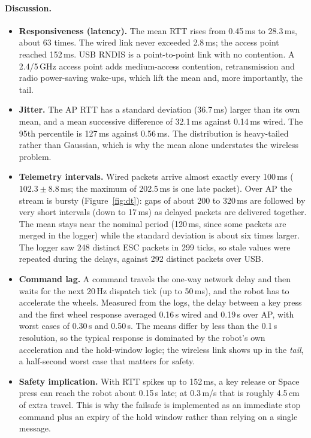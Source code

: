 \documentclass[11pt,a4paper]{article}
\begin{document}
\paragraph{Discussion.}
\begin{itemize}
  \item \textbf{Responsiveness (latency).} The mean RTT rises from 0.45\,ms to 28.3\,ms, about 63 times. The wired link never exceeded 2.8\,ms; the access point reached 152\,ms. USB RNDIS is a point-to-point link with no contention. A 2.4/5\,GHz access point adds medium-access contention, retransmission and radio power-saving wake-ups, which lift the mean and, more importantly, the tail.
  \item \textbf{Jitter.} The AP RTT has a standard deviation (36.7\,ms) larger than its own mean, and a mean successive difference of 32.1\,ms against 0.14\,ms wired. The 95th percentile is 127\,ms against 0.56\,ms. The distribution is heavy-tailed rather than Gaussian, which is why the mean alone understates the wireless problem.
  \item \textbf{Telemetry intervals.} Wired packets arrive almost exactly every 100\,ms ($102.3\pm8.8$\,ms; the maximum of 202.5\,ms is one late packet). Over AP the stream is bursty (Figure~\ref{fig:dt}): gaps of about 200 to 320\,ms are followed by very short intervals (down to 17\,ms) as delayed packets are delivered together. The mean stays near the nominal period (120\,ms, since some packets are merged in the logger) while the standard deviation is about six times larger. The logger saw 248 distinct ESC packets in 299 ticks, so stale values were repeated during the delays, against 292 distinct packets over USB.
  \item \textbf{Command lag.} A command travels the one-way network delay and then waits for the next 20\,Hz dispatch tick (up to 50\,ms), and the robot has to accelerate the wheels. Measured from the logs, the delay between a key press and the first wheel response averaged 0.16\,s wired and 0.19\,s over AP, with worst cases of 0.30\,s and 0.50\,s. The means differ by less than the 0.1\,s resolution, so the typical response is dominated by the robot's own acceleration and the hold-window logic; the wireless link shows up in the \emph{tail}, a half-second worst case that matters for safety.
  \item \textbf{Safety implication.} With RTT spikes up to 152\,ms, a key release or Space press can reach the robot about 0.15\,s late; at 0.3\,m/s that is roughly 4.5\,cm of extra travel. This is why the failsafe is implemented as an immediate stop command plus an expiry of the hold window rather than relying on a single message.
\end{itemize}
\end{document}
